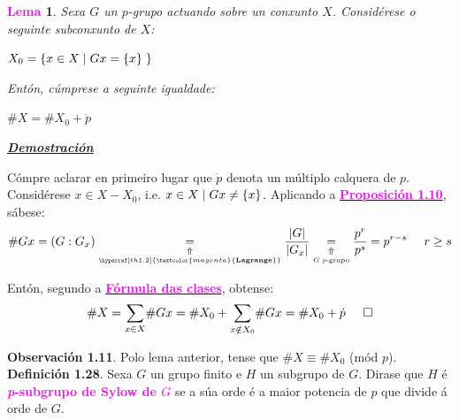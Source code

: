 \documentclass[twoside]{report}
\newcommand{\magbf}[1]{\textcolor{magenta}{\textbf{#1}}} %
\theoremstyle{mystyle}
\newtheorem{lem}{\magbf{Lema}}[chapter]
\newenvironment{lemma}
{\begin{mdframed}[linecolor = magenta,backgroundcolor = classicrose, linewidth = 2mm]\begin{lem}}
{\end{lem}\end{mdframed}}
\begin{document}
\begin{lemma} \label{lem1.1}
Sexa $G$ un $p$-grupo actuando sobre un conxunto $X$. Considérese o seguinte subconxunto de $X$:
\begin{center}
    $X_{0} = \{ x \in X \hspace{1mm} | \hspace{1mm} Gx = \{x\} \hspace{1mm}\}$
\end{center}
\noindent Entón, cúmprese a seguinte igualdade:
\begin{center}
    $\#X = \#X_{0} + \dot{p}$
\end{center}
\end{lemma}

\vspace{2mm}

\noindent \textbf{\textit{\underline{Demostración}}}

\vspace{5mm}

\noindent Cómpre aclarar en primeiro lugar que $\dot{p}$ denota un múltiplo calquera de $p$.\\

\noindent Considérese $x \in X - X_{0}$, i.e. $x \in X \hspace{1mm} | \hspace{1mm} Gx \neq \{x\}$. Aplicando a \hyperref[prop1.10]{\magbf{Proposición 1.10}}, sábese:
$$\#Gx = (G : G_{x}) \underset{\underset{\hyperref[th1.2]{\magbf{Lagrange}}}{\Uparrow}}{=} \displaystyle \frac{|G|}{|G_{x}|} \underset{\underset{G \text{ \textit{p}-grupo}}{\Uparrow}}{=} \displaystyle \frac{p^{r}}{p^{s}} = p^{r-s} \hspace{5mm} r \geq s$$

\noindent Entón, segundo a \hyperref[prop1.11]{\magbf{Fórmula das clases}}, obtense:
$$\#X = \underset{x \in X}{\sum}\#Gx = \#X_{0} + \underset{x \notin X_{0}}{\sum}\#Gx = \#X_{0} + \dot{p} \hspace{5mm} \square$$

\vspace{3mm}

\noindent \textbf{Observación 1.11}. Polo lema anterior, tense que $\#X \equiv \#X_{0}$ (mód $p$).\\

\noindent \textbf{Definición 1.28}. Sexa $G$ un grupo finito e $H$ un subgrupo de $G$. Dirase que $H$ é \magbf{\textit{p}-subgrupo de Sylow de $G$} se a súa orde é a maior potencia de $p$ que divide á orde de $G$.\\
\end{document}
